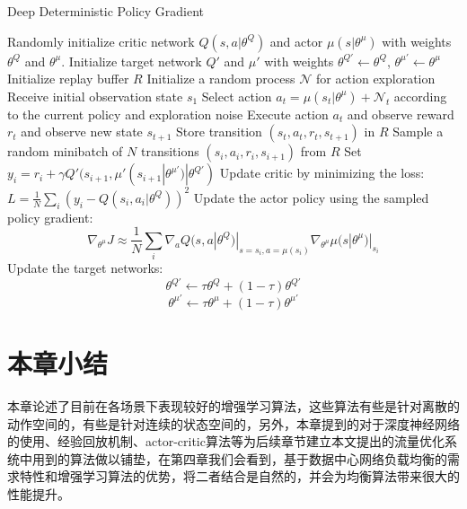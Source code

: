 \begin{algorithm}[h]
  \caption{Deep Deterministic Policy Gradient \cite{timothy2016cont} \label{algo:ddpg}}
  \label{dpgalgo}
  \begin{algorithmic}
    \State Randomly initialize critic network $Q(s, a | \theta^Q)$ and actor
    $\mu(s | \theta^{\mu})$ with weights $\theta^{Q}$ and $\theta^{\mu}$.
    \State Initialize target network $Q'$ and $\mu'$ with weights $\theta^{Q'}
    \leftarrow \theta^{Q}$, $\theta^{\mu'} \leftarrow \theta^{\mu}$
    \State Initialize replay buffer $R$
      \State Initialize a random process $\mathcal{N}$ for action
      exploration
      \State Receive initial observation state $s_1$
        \State Select action $a_t = \mu(s_t | \theta^{\mu}) + \mathcal{N}_t$
        according to the current policy and exploration noise
        \State Execute action $a_t$ and observe
        reward $r_t$ and observe new state $s_{t+1}$
        \State Store transition $(s_t, a_t,
                r_t, s_{t+1})$ in $R$
        \State Sample a random minibatch of $N$ transitions
               $(s_i, a_i,
        r_i, s_{i + 1})$ from $R$
        \State Set $ y_i = r_i + \gamma Q'(s_{i + 1},
        \mu'(s_{i+1} | \theta^{\mu'}) | \theta^{Q'}) $
        \State Update critic by minimizing the loss:
               $L = \frac{1}{N} \sum_i (y_i -
               Q(s_i, a_i | \theta^Q))^2$
        \State Update the actor policy using the sampled policy gradient:
        \begin{equation*}
            \nabla_{\theta^{\mu}} J \approx
            \frac{1}{N} \sum_i
               \nabla_{a} Q(s, a | \theta^Q)|_{s = s_i, a = \mu(s_i)}
               \nabla_{\theta^\mu} \mu(s | \theta^\mu)|_{s_i}
         \end{equation*}
        \State Update the target networks:
          \begin{equation*}
            \theta^{Q'} \leftarrow \tau \theta^{Q} + (1 - \tau) \theta^{Q'}
          \end{equation*}
          \begin{equation*}
            \theta^{\mu'} \leftarrow \tau \theta^{\mu} +
                (1 - \tau) \theta^{\mu'}
          \end{equation*}
        \EndFor
    \EndFor
  \end{algorithmic}
\end{algorithm}

\section{本章小结}
本章论述了目前在各场景下表现较好的增强学习算法，这些算法有些是针对离散的动作空间的，有些是针对连续的状态空间的，另外，本章提到的对于深度神经网络的使用、经验回放机制、actor-critic算法等为后续章节建立本文提出的流量优化系统中用到的算法做以铺垫，在第四章我们会看到，基于数据中心网络负载均衡的需求特性和增强学习算法的优势，将二者结合是自然的，并会为均衡算法带来很大的性能提升。
